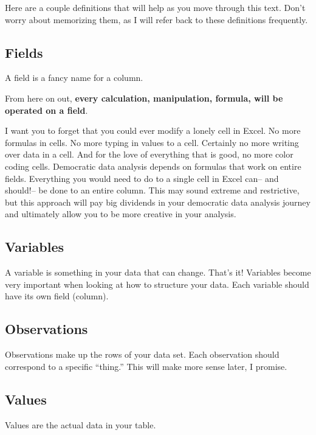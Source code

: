 \documentclass[
]{book}
\begin{document}
Here are a couple definitions that will help as you move through this text. Don't worry about memorizing them, as I will refer back to these definitions frequently.

\hypertarget{fields}{%
\subsection{Fields}\label{fields}}

A field is a fancy name for a column.

From here on out, \textbf{every calculation, manipulation, formula, will be operated on a field}.

I want you to forget that you could ever modify a lonely cell in Excel. No more formulas in cells. No more typing in values to a cell. Certainly no more writing over data in a cell. And for the love of everything that is good, no more color coding cells. Democratic data analysis depends on formulas that work on entire fields. Everything you would need to do to a single cell in Excel can-- and should!-- be done to an entire column. This may sound extreme and restrictive, but this approach will pay big dividends in your democratic data analysis journey and ultimately allow you to be more creative in your analysis.

\hypertarget{variables}{%
\subsection{Variables}\label{variables}}

A variable is something in your data that can change. That's it! Variables become very important when looking at how to structure your data. Each variable should have its own field (column).

\hypertarget{observations}{%
\subsection{Observations}\label{observations}}

Observations make up the rows of your data set. Each observation should correspond to a specific ``thing.'' This will make more sense later, I promise.

\hypertarget{values}{%
\subsection{Values}\label{values}}

Values are the actual data in your table.
\end{document}
